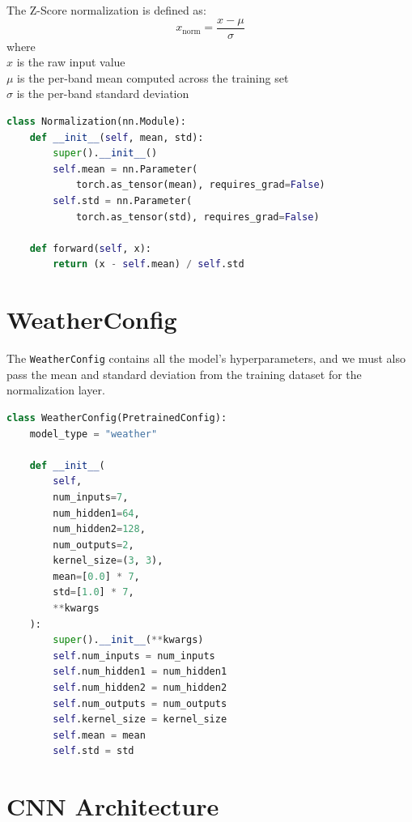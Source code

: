 \documentclass[12pt, a4paper]{report}
\begin{document}
The Z-Score normalization is defined as:
\begin{equation}
    x_{\text{norm}} = \frac{x - \mu}{\sigma}
    \label{eq:zscore}
\end{equation}
where \\
$x$ is the raw input value\\
$\mu$ is the per-band mean computed across the training set\\
$\sigma$ is the per-band standard deviation

\begin{lstlisting}[language=Python, caption=Normalization layer implementation.]
class Normalization(nn.Module):
    def __init__(self, mean, std):
        super().__init__()
        self.mean = nn.Parameter(
            torch.as_tensor(mean), requires_grad=False)
        self.std = nn.Parameter(
            torch.as_tensor(std), requires_grad=False)

    def forward(self, x):
        return (x - self.mean) / self.std
\end{lstlisting}

\section{WeatherConfig}

The \texttt{WeatherConfig} contains all the model's hyperparameters, and we must also pass the mean and standard deviation from the training dataset for the normalization layer.

\begin{lstlisting}[language=Python, caption=Model configuration class.]
class WeatherConfig(PretrainedConfig):
    model_type = "weather"

    def __init__(
        self,
        num_inputs=7,
        num_hidden1=64,
        num_hidden2=128,
        num_outputs=2,
        kernel_size=(3, 3),
        mean=[0.0] * 7,
        std=[1.0] * 7,
        **kwargs
    ):
        super().__init__(**kwargs)
        self.num_inputs = num_inputs
        self.num_hidden1 = num_hidden1
        self.num_hidden2 = num_hidden2
        self.num_outputs = num_outputs
        self.kernel_size = kernel_size
        self.mean = mean
        self.std = std
\end{lstlisting}

\section{CNN Architecture}
\end{document}
